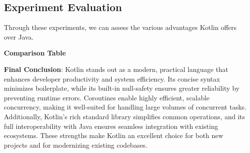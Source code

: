 \vspace{1em}

\subsection{Experiment Evaluation}

Through these experiments, we can assess the various advantages Kotlin offers over Java. 
\vspace{1em}

\noindent \textbf{Comparison Table}

\vspace{1em}

\begin{table}[ht]
\centering
{}
\caption{Comparison of Kotlin and Java}
\label{tab:comparison}
\end{table}


\vspace{1em}

\noindent \textbf{Final Conclusion}: Kotlin stands out as a modern, practical language that enhances developer productivity and system efficiency. Its concise syntax minimizes boilerplate, while its built-in null-safety ensures greater reliability by preventing runtime errors. Coroutines enable highly efficient, scalable concurrency, making it well-suited for handling large volumes of concurrent tasks. Additionally, Kotlin’s rich standard library simplifies common operations, and its full interoperability with Java ensures seamless integration with existing ecosystems. These strengths make Kotlin an excellent choice for both new projects and for modernizing existing codebases.
